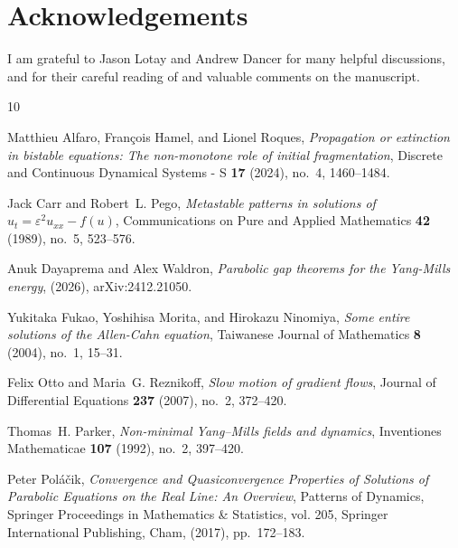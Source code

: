 \documentclass[11pt,a4paper]{article}
\numberwithin{equation}{section}
\theoremstyle{plain}
\theoremstyle{remark}
\begin{document}
\section*{Acknowledgements}

I am grateful to Jason Lotay and Andrew Dancer for many helpful discussions,
and for their careful reading of and valuable comments on the manuscript.

\bigskip

\providecommand{\bysame}{\leavevmode\hbox to3em{\hrulefill}\thinspace}
\providecommand{\MR}{\relax\ifhmode\unskip\space\fi MR }
\providecommand{\MRhref}[2]{%
  \href{http://www.ams.org/mathscinet-getitem?mr=#1}{#2}
}
\providecommand{\href}[2]{#2}
\begin{thebibliography}{10}

Matthieu Alfaro, François Hamel, and Lionel Roques, \emph{Propagation or extinction in bistable equations: The non-monotone role of initial fragmentation}, Discrete and Continuous Dynamical Systems - S \textbf{17} (2024), no.~4, 1460–1484.

Jack Carr and Robert~L. Pego, \emph{Metastable patterns in solutions of \(u_t = \varepsilon^2 u_{xx} - f(u)\)}, Communications on Pure and Applied Mathematics \textbf{42} (1989), no.~5, 523--576.

Anuk Dayaprema and Alex Waldron, \emph{Parabolic gap theorems for the {Yang-Mills} energy},  (2026), arXiv:2412.21050.

Yukitaka Fukao, Yoshihisa Morita, and Hirokazu Ninomiya, \emph{Some entire solutions of the {Allen-Cahn} equation}, Taiwanese Journal of Mathematics \textbf{8} (2004), no.~1, 15--31.

Felix Otto and Maria~G. Reznikoff, \emph{Slow motion of gradient flows}, Journal of Differential Equations \textbf{237} (2007), no.~2, 372--420.

Thomas~H. Parker, \emph{Non-minimal {Yang--Mills} fields and dynamics}, Inventiones Mathematicae \textbf{107} (1992), no.~2, 397--420.

Peter Pol{\'a}{\v c}ik, \emph{{Convergence and Quasiconvergence Properties of Solutions of Parabolic Equations on the Real Line: An Overview}}, {Patterns of Dynamics}, Springer Proceedings in Mathematics \& Statistics, vol. 205, Springer International Publishing, Cham, (2017), pp.~172--183.


\end{thebibliography}
\end{document}
